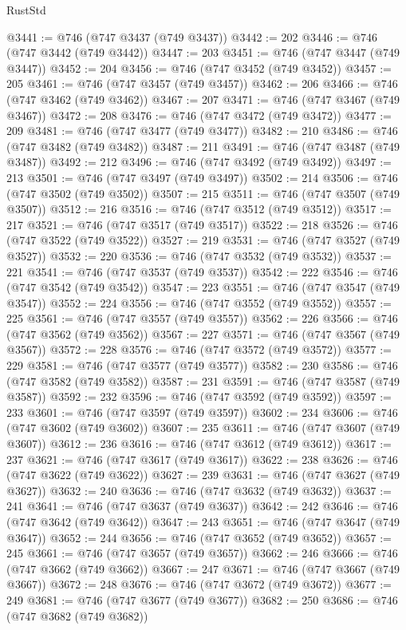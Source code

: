 \begin{lexlean}{RustStd}
\begin{coremodule}
@3441 := @746 (@747 @3437 (@749 @3437))
@3442 := 202
@3446 := @746 (@747 @3442 (@749 @3442))
@3447 := 203
@3451 := @746 (@747 @3447 (@749 @3447))
@3452 := 204
@3456 := @746 (@747 @3452 (@749 @3452))
@3457 := 205
@3461 := @746 (@747 @3457 (@749 @3457))
@3462 := 206
@3466 := @746 (@747 @3462 (@749 @3462))
@3467 := 207
@3471 := @746 (@747 @3467 (@749 @3467))
@3472 := 208
@3476 := @746 (@747 @3472 (@749 @3472))
@3477 := 209
@3481 := @746 (@747 @3477 (@749 @3477))
@3482 := 210
@3486 := @746 (@747 @3482 (@749 @3482))
@3487 := 211
@3491 := @746 (@747 @3487 (@749 @3487))
@3492 := 212
@3496 := @746 (@747 @3492 (@749 @3492))
@3497 := 213
@3501 := @746 (@747 @3497 (@749 @3497))
@3502 := 214
@3506 := @746 (@747 @3502 (@749 @3502))
@3507 := 215
@3511 := @746 (@747 @3507 (@749 @3507))
@3512 := 216
@3516 := @746 (@747 @3512 (@749 @3512))
@3517 := 217
@3521 := @746 (@747 @3517 (@749 @3517))
@3522 := 218
@3526 := @746 (@747 @3522 (@749 @3522))
@3527 := 219
@3531 := @746 (@747 @3527 (@749 @3527))
@3532 := 220
@3536 := @746 (@747 @3532 (@749 @3532))
@3537 := 221
@3541 := @746 (@747 @3537 (@749 @3537))
@3542 := 222
@3546 := @746 (@747 @3542 (@749 @3542))
@3547 := 223
@3551 := @746 (@747 @3547 (@749 @3547))
@3552 := 224
@3556 := @746 (@747 @3552 (@749 @3552))
@3557 := 225
@3561 := @746 (@747 @3557 (@749 @3557))
@3562 := 226
@3566 := @746 (@747 @3562 (@749 @3562))
@3567 := 227
@3571 := @746 (@747 @3567 (@749 @3567))
@3572 := 228
@3576 := @746 (@747 @3572 (@749 @3572))
@3577 := 229
@3581 := @746 (@747 @3577 (@749 @3577))
@3582 := 230
@3586 := @746 (@747 @3582 (@749 @3582))
@3587 := 231
@3591 := @746 (@747 @3587 (@749 @3587))
@3592 := 232
@3596 := @746 (@747 @3592 (@749 @3592))
@3597 := 233
@3601 := @746 (@747 @3597 (@749 @3597))
@3602 := 234
@3606 := @746 (@747 @3602 (@749 @3602))
@3607 := 235
@3611 := @746 (@747 @3607 (@749 @3607))
@3612 := 236
@3616 := @746 (@747 @3612 (@749 @3612))
@3617 := 237
@3621 := @746 (@747 @3617 (@749 @3617))
@3622 := 238
@3626 := @746 (@747 @3622 (@749 @3622))
@3627 := 239
@3631 := @746 (@747 @3627 (@749 @3627))
@3632 := 240
@3636 := @746 (@747 @3632 (@749 @3632))
@3637 := 241
@3641 := @746 (@747 @3637 (@749 @3637))
@3642 := 242
@3646 := @746 (@747 @3642 (@749 @3642))
@3647 := 243
@3651 := @746 (@747 @3647 (@749 @3647))
@3652 := 244
@3656 := @746 (@747 @3652 (@749 @3652))
@3657 := 245
@3661 := @746 (@747 @3657 (@749 @3657))
@3662 := 246
@3666 := @746 (@747 @3662 (@749 @3662))
@3667 := 247
@3671 := @746 (@747 @3667 (@749 @3667))
@3672 := 248
@3676 := @746 (@747 @3672 (@749 @3672))
@3677 := 249
@3681 := @746 (@747 @3677 (@749 @3677))
@3682 := 250
@3686 := @746 (@747 @3682 (@749 @3682))

\end{coremodule}
\end{lexlean}

